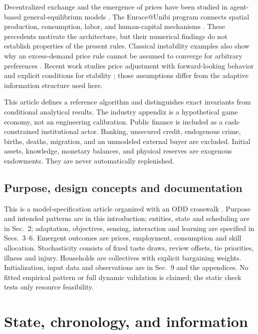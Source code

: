 \documentclass[10pt,a4paper,twocolumn]{article}
\begin{document}
Decentralized exchange and the emergence of prices have been studied in
agent-based general-equilibrium models \cite{gintis2007}. The
Eurace@Unibi program connects spatial production, consumption, labor, and
human-capital mechanisms \cite{dawid2014}. These precedents motivate the
architecture, but their numerical findings do not establish properties of
the present rules. Classical instability examples also show why an
excess-demand price rule cannot be assumed to converge for arbitrary
preferences \cite{scarf1960}. Recent work studies price adjustment with
forward-looking behavior and explicit conditions for stability
\cite{werning2026}; those assumptions differ from the adaptive information
structure used here.

This article defines a reference algorithm and distinguishes exact
invariants from conditional analytical results. The industry appendix is
a hypothetical game economy, not an engineering calibration. Public
finance is included as a cash-constrained institutional actor. Banking,
unsecured credit, endogenous crime, births, deaths, migration, and an
unmodeled external buyer are excluded. Initial assets, knowledge, monetary
balances, and physical reserves are exogenous endowments. They are never
automatically replenished.

\subsection{Purpose, design concepts and documentation}
This is a model-specification article organized with an ODD crosswalk
\cite{grimm2020}. Purpose and intended patterns are in this introduction;
entities, state and scheduling are in Sec.~2; adaptation, objectives,
sensing, interaction and learning are specified in Secs.~3--6.
Emergent outcomes are prices, employment, consumption and skill allocation.
Stochasticity consists of fixed taste draws, review offsets, tie priorities,
illness and injury. Households are collectives with explicit bargaining
weights. Initialization, input data and observations are in Sec.~9 and
the appendices. No fitted empirical pattern or full dynamic validation
is claimed; the static check tests only resource feasibility.

\section{State, chronology, and information}
\end{document}
